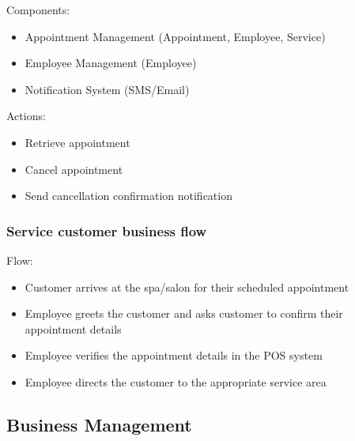 \documentclass[]{VUMIFTemplateClass}
\begin{document}
Components:
\begin{itemize}
    \setlength{\itemsep}{2pt}
    \setlength{\parskip}{0pt}
    \setlength{\parsep}{0pt}
    \item Appointment Management (Appointment, Employee, Service)
    \item Employee Management (Employee)
    \item Notification System (SMS/Email)
\end{itemize}

Actions:
\begin{itemize}
    \setlength{\itemsep}{2pt}
    \setlength{\parskip}{0pt}
    \setlength{\parsep}{0pt}
    \item Retrieve appointment
    \item Cancel appointment
    \item Send cancellation confirmation notification
\end{itemize}


\subsubsection{Service customer business flow}

Flow:
\begin{itemize}
    \setlength{\itemsep}{2pt}
    \setlength{\parskip}{0pt}
    \setlength{\parsep}{0pt}
        \item Customer arrives at the spa/salon for their scheduled appointment
    \item Employee greets the customer and asks customer to confirm their appointment details
    \item Employee verifies the appointment details in the POS system
    \item Employee directs the customer to the appropriate service area
\end{itemize}

\subsection{Business Management}
\end{document}
